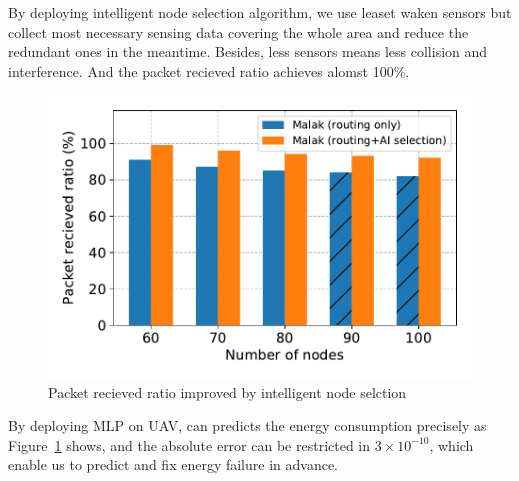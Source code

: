 By deploying intelligent node selection algorithm, we use leaset waken sensors
but collect most necessary sensing data covering the whole area and reduce the
redundant ones in the meantime. Besides, less sensors means less collision and
interference. And the packet recieved ratio achieves alomst 100\%.

\begin{figure}[htbp]
	\centering
	\includegraphics[width=.95\columnwidth]{Figure/ai_selection}
	\vspace{-0.1in}
	\caption{Packet recieved ratio improved by intelligent node selction
		\textnormal{
		}}
	\label{fig:ai_selection}
\end{figure}

By deploying MLP on UAV, {\sdn} can predicts the energy consumption precisely as
Figure~\ref{fig:ai_selection} shows, and the absolute error can be restricted in
$3\times10^{-10}$, which enable us to predict and fix energy failure in advance.

